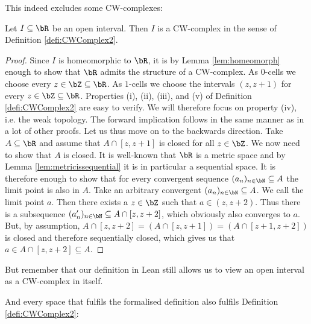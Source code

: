 This indeed excludes some CW-complexes:

\begin{example}
  Let $I \subseteq \bR$ be an open interval.
  Then $I$ is a CW-complex in the sense of Definition \ref{defi:CWComplex2}.
\end{example}
\begin{proof}
  Since $I$ is homeomorphic to $\bR$, it is by Lemma \ref{lem:homeomorph} enough to show that $\bR$ admits the structure of a CW-complex.
  As $0$-cells we choose every $z \in \bZ \subseteq \bR$.
  As $1$-cells we choose the intervals $(z, z + 1)$ for every $z \in \bZ \subseteq \bR$.
  Properties (i), (ii), (iii), and (v) of Definition \ref{defi:CWComplex2} are easy to verify.
  We will therefore focus on property (iv), i.e. the weak topology.
  The forward implication follows in the same manner as in a lot of other proofs.
  Let us thus move on to the backwards direction.
  Take $A \subseteq \bR$ and assume that $A \cap [z, z + 1]$ is closed for all $z \in \bZ$.
  We now need to show that $A$ is closed.
  It is well-known that $\bR$ is a metric space 
  \href{https://github.com/leanprover-community/mathlib4/blob/93828f4cd10fb8cab31700b110fd2751d36bf1b8/Mathlib/Topology/MetricSpace/Basic.lean#L117-L118}{\faExternalLink}
  and by Lemma \ref{lem:metricissequential} it is in particular a sequential space.
  It is therefore enough to show that for every convergent sequence $(a_n)_{n \in \bN} \subseteq A$ the limit point is also in $A$.
  Take an arbitrary convergent $(a_n)_{n \in \bN} \subseteq A$.
  We call the limit point $a$.
  Then there exists a $z \in \bZ$ such that $a \in (z, z + 2)$.
  Thus there is a subsequence $(a'_n)_{n \in \bN} \subseteq A \cap [z, z + 2]$, which obviously also converges to $a$.
  But, by assumption, $A \cap [z, z + 2] = (A \cap [z, z + 1]) = (A \cap [z + 1, z + 2])$ is closed and therefore sequentially closed, which gives us that $a \in A \cap [z, z + 2] \subseteq A$.
\end{proof}

But remember that our definition in Lean still allows us to view an open interval as a CW-complex in itself.

And every space that fulfils the formalised definition also fulfils Definition \ref{defi:CWComplex2}:

